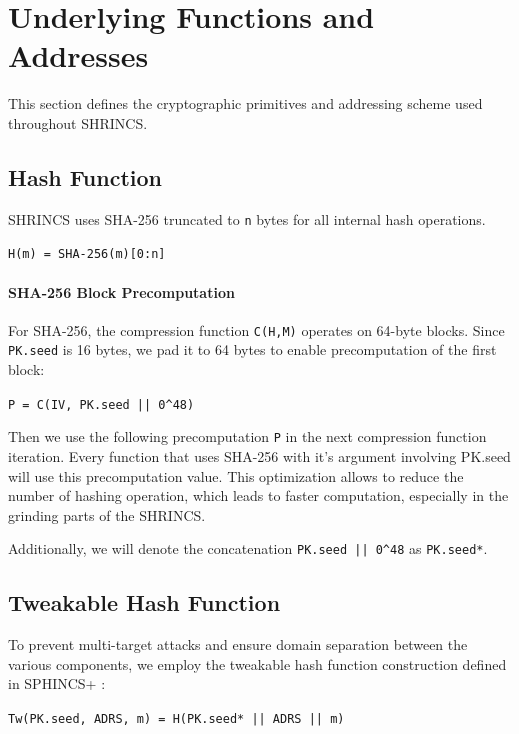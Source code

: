 \section{Underlying Functions and Addresses}
This section defines the cryptographic primitives and addressing scheme used throughout SHRINCS.
\subsection{Hash Function}

SHRINCS uses SHA-256 truncated to \texttt{n} bytes for all internal hash operations. 
\begin{center}
    \texttt{H(m) = SHA-256(m)[0:n]}
\end{center}

\paragraph{SHA-256 Block Precomputation} 
For SHA-256, the compression function \texttt{C(H,M)} operates on 64-byte blocks. Since \texttt{PK.seed} is 16 bytes, we pad it to 64 bytes to enable precomputation of the first block:

\begin{center}
    \texttt{P = C(IV, PK.seed || 0\string^48)}
\end{center}

Then we use the following precomputation \texttt{P} in the next compression function iteration.
Every function that uses SHA-256 with it's argument involving PK.seed will use this precomputation value. This optimization allows to reduce the number of hashing operation, which leads to faster computation, especially in the grinding parts of the SHRINCS. 

Additionally, we will denote the concatenation \texttt{PK.seed || 0\string^48} as \texttt{PK.seed*}. 

\subsection{Tweakable Hash Function}
To prevent multi-target attacks and ensure domain separation between the various components, we employ the tweakable hash function construction defined in SPHINCS+ \cite{sphincsplus_paper2019}:

\begin{center}
    \texttt{Tw(PK.seed, ADRS, m) = H(PK.seed* || ADRS || m)}
\end{center}

